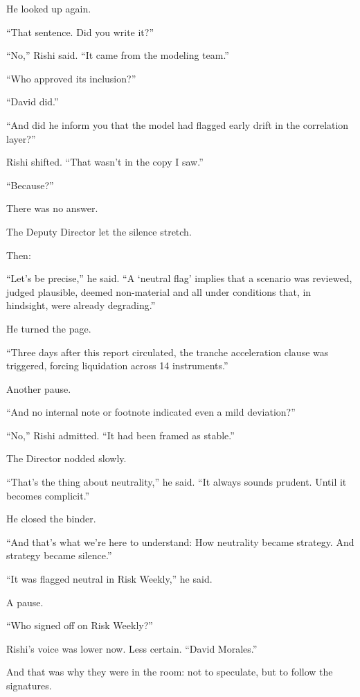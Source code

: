 He looked up again.

“That sentence. Did you write it?”

“No,” Rishi said. “It came from the modeling team.”

“Who approved its inclusion?”

“David did.”

“And did he inform you that the model had flagged early drift in the correlation layer?”

Rishi shifted. “That wasn’t in the copy I saw.”

“Because?”

There was no answer.

The Deputy Director let the silence stretch.

Then:

“Let’s be precise,” he said. “A ‘neutral flag’ implies that a scenario was reviewed, judged 
plausible, deemed non-material and all under conditions that, in hindsight, were already 
degrading.”

He turned the page.

“Three days after this report circulated, the tranche acceleration clause was triggered, 
forcing liquidation across 14 instruments.”

Another pause.

“And no internal note or footnote indicated even a mild deviation?”

“No,” Rishi admitted. “It had been framed as stable.”

The Director nodded slowly.

“That’s the thing about neutrality,” he said. “It always sounds prudent. Until it becomes complicit.”

He closed the binder.

“And that’s what we’re here to understand:
How neutrality became strategy.
And strategy became silence.”

“It was flagged neutral in Risk Weekly,” he said.

A pause.

“Who signed off on Risk Weekly?”

Rishi’s voice was lower now. Less certain.
“David Morales.”

And that was why they were in the room: not to speculate, but to follow the signatures.

\medskip

